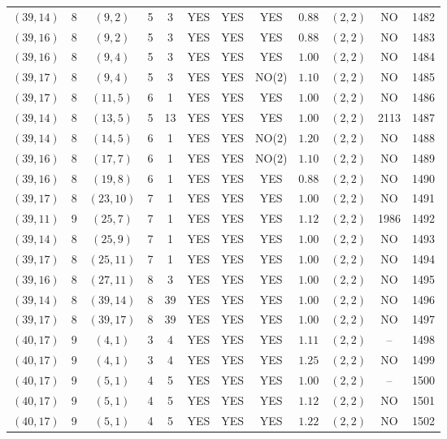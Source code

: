 \begin{longtable}{|c|c|c|c|c|c|c|c|c|c|c|c|}
$(39,14)$ & 8 & $(9,2)$ & 5 & 3 & YES & YES & YES & $0.88$ & $(2,2)$ & NO & 1482\\
$(39,16)$ & 8 & $(9,2)$ & 5 & 3 & YES & YES & YES & $0.88$ & $(2,2)$ & NO & 1483\\
$(39,16)$ & 8 & $(9,4)$ & 5 & 3 & YES & YES & YES & $1.00$ & $(2,2)$ & NO & 1484\\
$(39,17)$ & 8 & $(9,4)$ & 5 & 3 & YES & YES & NO(2) & $1.10$ & $(2,2)$ & NO & 1485\\
$(39,17)$ & 8 & $(11,5)$ & 6 & 1 & YES & YES & YES & $1.00$ & $(2,2)$ & NO & 1486\\
$(39,14)$ & 8 & $(13,5)$ & 5 & 13 & YES & YES & YES & $1.00$ & $(2,2)$ & 2113 & 1487\\
$(39,14)$ & 8 & $(14,5)$ & 6 & 1 & YES & YES & NO(2) & $1.20$ & $(2,2)$ & NO & 1488\\
$(39,16)$ & 8 & $(17,7)$ & 6 & 1 & YES & YES & NO(2) & $1.10$ & $(2,2)$ & NO & 1489\\
$(39,16)$ & 8 & $(19,8)$ & 6 & 1 & YES & YES & YES & $0.88$ & $(2,2)$ & NO & 1490\\
$(39,17)$ & 8 & $(23,10)$ & 7 & 1 & YES & YES & YES & $1.00$ & $(2,2)$ & NO & 1491\\
$(39,11)$ & 9 & $(25,7)$ & 7 & 1 & YES & YES & YES & $1.12$ & $(2,2)$ & 1986 & 1492\\
$(39,14)$ & 8 & $(25,9)$ & 7 & 1 & YES & YES & YES & $1.00$ & $(2,2)$ & NO & 1493\\
$(39,17)$ & 8 & $(25,11)$ & 7 & 1 & YES & YES & YES & $1.00$ & $(2,2)$ & NO & 1494\\
$(39,16)$ & 8 & $(27,11)$ & 8 & 3 & YES & YES & YES & $1.00$ & $(2,2)$ & NO & 1495\\
$(39,14)$ & 8 & $(39,14)$ & 8 & 39 & YES & YES & YES & $1.00$ & $(2,2)$ & NO & 1496\\
$(39,17)$ & 8 & $(39,17)$ & 8 & 39 & YES & YES & YES & $1.00$ & $(2,2)$ & NO & 1497\\
$(40,17)$ & 9 & $(4,1)$ & 3 & 4 & YES & YES & YES & $1.11$ & $(2,2)$ & -- & 1498\\
$(40,17)$ & 9 & $(4,1)$ & 3 & 4 & YES & YES & YES & $1.25$ & $(2,2)$ & NO & 1499\\
$(40,17)$ & 9 & $(5,1)$ & 4 & 5 & YES & YES & YES & $1.00$ & $(2,2)$ & -- & 1500\\
$(40,17)$ & 9 & $(5,1)$ & 4 & 5 & YES & YES & YES & $1.12$ & $(2,2)$ & NO & 1501\\
$(40,17)$ & 9 & $(5,1)$ & 4 & 5 & YES & YES & YES & $1.22$ & $(2,2)$ & NO & 1502\\

\end{longtable}
